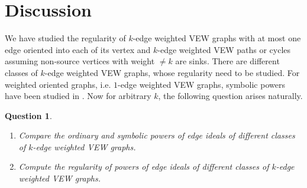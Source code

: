 \documentclass[11pt,reqno]{amsart}
\newtheorem{question}{Question}
\theoremstyle{definition}
\begin{document}
\section{Discussion}\label{sec7}
We have studied the regularity of $k$-edge weighted VEW graphs with at most one edge oriented into each of its vertex and  $k$-edge weighted VEW paths or cycles assuming non-source vertices with weight $\neq k  $  are sinks. There are different classes of $k$-edge weighted VEW graphs, whose regularity need to be studied.
For weighted oriented graphs, i.e. $1$-edge weighted VEW graphs, symbolic powers have been studied in \cite{kanoy1, mandal2,mandal3,mandal4}. Now for arbitrary $k$, the following question arises naturally.




\begin{question}
\begin{enumerate}
    \item[(a)] Compare the ordinary and symbolic powers of edge ideals of different classes of $k$-edge weighted VEW graphs.  

    \item[(b)] Compute the regularity of powers of edge ideals of different classes of $k$-edge weighted VEW graphs.              

\end{enumerate} 
\end{question}
\end{document}
